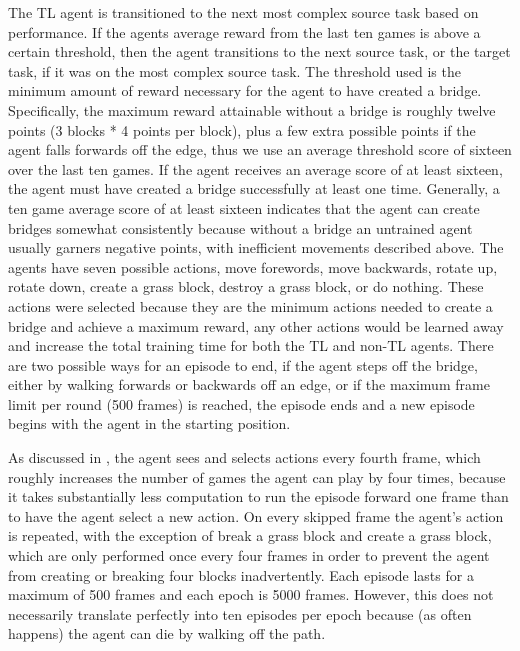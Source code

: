 \documentclass{llncs}
\begin{document}
The TL agent is transitioned to the next most complex source task based on performance.
If the agents average reward from the last ten games is above a certain threshold, then the agent transitions to the next source task, or the target task, if it was on the most complex source task.
The threshold used is the minimum amount of reward necessary for the agent to have created a bridge. 
Specifically, the maximum reward attainable without a bridge is roughly twelve points (3 blocks * 4 points per block), plus a few extra possible points if the agent falls forwards off the edge, thus we use an average threshold score of sixteen over the last ten games.
If the agent receives an average score of at least sixteen, the agent must have created a bridge successfully at least one time. 
Generally, a ten game average score of at least sixteen indicates that the agent can create bridges somewhat consistently because without a bridge an untrained agent usually garners negative points, with inefficient movements described above. 
The agents have seven possible actions, move forewords, move backwards, rotate up, rotate down, create a grass block, destroy a grass block, or do nothing. 
These actions were selected because they are the minimum actions needed to create a bridge and achieve a maximum reward, any other actions would be learned away and increase the total training time for both the TL and non-TL agents. 
There are two possible ways for an episode to end, if the agent steps off the bridge, either by walking forwards or backwards off an edge, or if the maximum frame limit per round (500 frames) is reached, the episode ends and a new episode begins with the agent in the starting position. 

As discussed in \citep{mnih2015human}, the agent sees and selects actions every fourth frame, which roughly increases the number of games the agent can play by four times, because it takes substantially less computation to run the episode forward one frame than to have the agent select a new action. 
On every skipped frame the agent's action is repeated, with the exception of break a grass block and create a grass block, which are only performed once every four frames in order to prevent the agent from creating or breaking four blocks inadvertently. 
Each episode lasts for a maximum of 500 frames and each epoch is 5000 frames. 
However, this does not necessarily translate perfectly into ten episodes per epoch because (as often happens) the agent can die by walking off the path.
\end{document}
